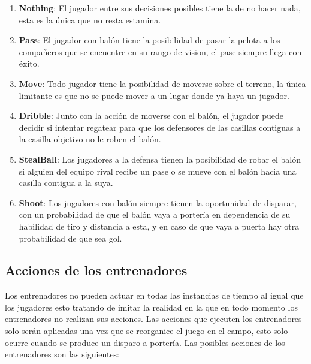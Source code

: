 \documentclass{article}
\begin{document}
\begin{enumerate}
      \item \textbf{Nothing}: El jugador entre sus decisiones posibles tiene la de no hacer nada, esta es la única que no resta estamina.
            
      \item \textbf{Pass}: El jugador con balón tiene la posibilidad de pasar la pelota a los compañeros que se encuentre en su rango de vision, el pase siempre llega con éxito.
            
      \item \textbf{Move}: Todo jugador tiene la posibilidad de moverse sobre el terreno, la única limitante es que no se puede mover a un lugar donde ya haya un jugador.
            
      \item \textbf{Dribble}: Junto con la acción de moverse con el balón, el jugador puede decidir si intentar regatear para que los defensores de las casillas contiguas a la casilla objetivo no le roben el balón.
            
      \item \textbf{StealBall}: Los jugadores a la defensa tienen la posibilidad de robar el balón si alguien del equipo rival recibe un pase  o se mueve con el balón hacia una casilla contigua a la suya.
            
      \item \textbf{Shoot}: Los jugadores con balón siempre tienen la oportunidad de disparar, con un probabilidad de que el balón vaya a portería en dependencia de su habilidad de tiro y distancia a esta, y en caso de que vaya a puerta hay otra probabilidad de que sea gol.
            
\end{enumerate}


\subsection{Acciones de los entrenadores}

Los entrenadores no pueden actuar en todas las instancias de tiempo al igual que los jugadores esto tratando de imitar la realidad
en la que en todo momento los entrenadores no realizan sus acciones. Las acciones que ejecuten los entrenadores solo
serán aplicadas una vez que se reorganice el juego en el campo, esto solo ocurre cuando se produce un disparo a portería.
Las posibles acciones de los entrenadores son las siguientes:
\end{document}
